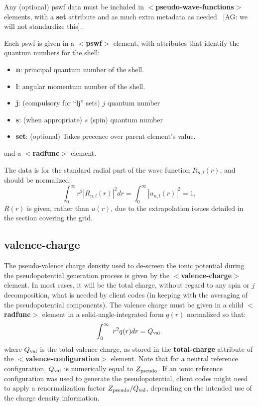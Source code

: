 \documentclass[prb,showpacs,superscriptaddress]{revtex4-1}
\def\tag#1{\textbf{$<$#1$>$}}
\def\att#1{\textbf{#1}}
\newcommand{\AG}[1]{{\color{red}~\textsf{[AG: #1]}}}
\begin{document}
Any (optional) pswf data must be included in
\tag{pseudo-wave-functions} elements, with a \att{set} attribute and
as much extra metadata as needed \AG{we will not standardize this}.

Each pswf is given in a \tag{pswf} element, with attributes that
identify the quantum numbers for the shell:

 \begin{itemize}
    \item \att{n}: principal quantum number of the shell. 
    \item \att{l}: angular momentum number of the shell.
    \item \att{j}: (compulsory for ``lj'' sets) $j$ quantum number
    \item \att{s}: (when appropriate) $s$ (spin) quantum number
    \item \att{set}: (optional) Takes precence over parent element's value.
 \end{itemize}

and a \tag{radfunc} element.

The data is for the standard radial part of the wave function
$R_{n,l}(r)$, and should be normalized:
      \begin{equation}
        \int_{0}^{\infty} r^{2} \left| R_{n,l}(r) \right|^{2} dr=
        \int_{0}^{\infty} \left| u_{n,l}(r) \right|^{2} = 1,
        \label{eq:norm}
      \end{equation}
%
$R(r)$ is given, rather than $u(r)$, due to the extrapolation
issues detailed in the section covering the grid.

\subsection{valence-charge}

The pseudo-valence charge density used to de-screen
the ionic potential during the pseudopotential generation process is
given by the \tag{valence-charge} element. In most cases, it will
be the total charge, without regard to any spin or $j$ decomposition, what is
needed by client codes (in keeping with the averaging of the
pseudopotential components). The valence charge must be given in a
child \tag{radfunc} element in a solid-angle-integrated 
form $q(r)$ normalized so that:
%
 \begin{equation}
    \int_{0}^{\infty} r^2 q(r) dr = Q_{\rm val}.
    \label{eq:normrhoval}
 \end{equation}
%
where $Q_{\rm val}$ is the total valence charge, as stored in the
\att{total-charge} attribute of the \tag{valence-configuration}
element.  Note that for a neutral reference configuration, $Q_{\rm
  val}$ is numerically equal to $Z_{\rm pseudo}$. If an ionic
reference configuration was used to generate the pseudopotential,
client codes might need to apply a renormalization factor $Z_{\rm
  pseudo}/Q_{\rm val}$, depending on the intended use of the charge
density information.
\end{document}
